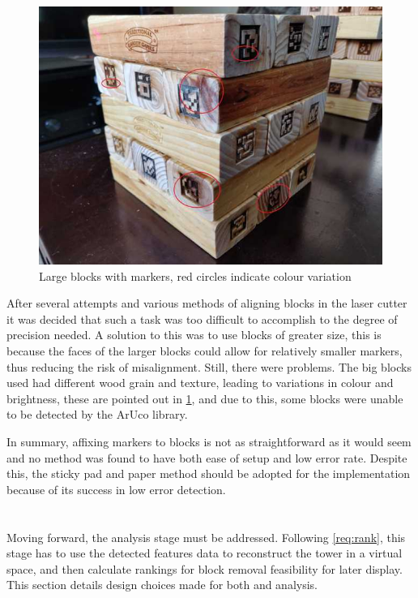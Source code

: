 \begin{figure}[ht]
\begin{minipage}{0.45\textwidth}
  \includegraphics[width=\linewidth]{images/design/largeblocks}
  \caption{Large blocks with markers, red circles indicate colour variation}
  \label{fig:largeblocks}
\end{minipage}
\end{figure}

After several attempts and various methods of aligning blocks in the laser cutter it was decided that such a task was too difficult to accomplish to the degree of precision needed. A solution to this was to use blocks of greater size, this is because the faces of the larger blocks could allow for relatively smaller markers, thus reducing the risk of misalignment. Still, there were problems. The big blocks used had different wood grain and texture, leading to variations in colour and brightness, these are pointed out in \cref{fig:largeblocks}, and due to this, some blocks were unable to be detected by the ArUco library.

In summary, affixing markers to blocks is not as straightforward as it would seem and no method was found to have both ease of setup and low error rate. Despite this, the sticky pad and paper method should be adopted for the implementation because of its success in low error detection.

\section{\analysis}

Moving forward, the analysis stage must be addressed. Following \cref{req:rank}, this stage has to use the detected features data to reconstruct the tower in a virtual space, and then calculate rankings for block removal feasibility for later display. This section details design choices made for both  and  analysis.

